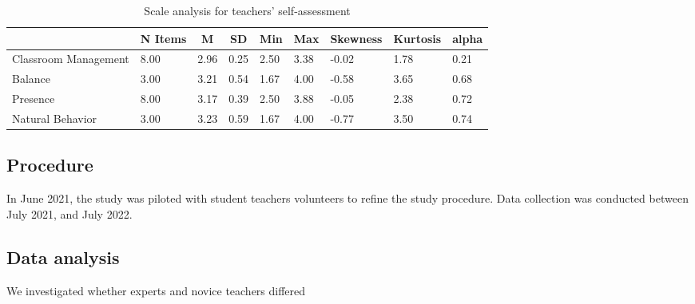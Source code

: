\documentclass[
  man,floatsintext]{apa6}
\begin{document}
\begin{table}[h]

\begin{center}
\begin{threeparttable}

\caption{\label{tab:presence_questionnaire}Scale analysis for teachers' self-assessment}

\tiny{

\begin{tabular}{lllllllll}
\toprule
 & \multicolumn{1}{c}{N Items} & \multicolumn{1}{c}{M} & \multicolumn{1}{c}{SD} & \multicolumn{1}{c}{Min} & \multicolumn{1}{c}{Max} & \multicolumn{1}{c}{Skewness} & \multicolumn{1}{c}{Kurtosis} & \multicolumn{1}{c}{alpha}\\
\midrule
Classroom Management & 8.00 & 2.96 & 0.25 & 2.50 & 3.38 & -0.02 & 1.78 & 0.21\\
Balance & 3.00 & 3.21 & 0.54 & 1.67 & 4.00 & -0.58 & 3.65 & 0.68\\
Presence & 8.00 & 3.17 & 0.39 & 2.50 & 3.88 & -0.05 & 2.38 & 0.72\\
Natural Behavior & 3.00 & 3.23 & 0.59 & 1.67 & 4.00 & -0.77 & 3.50 & 0.74\\
\bottomrule
\end{tabular}

}

\end{threeparttable}
\end{center}

\end{table}

\hypertarget{procedure}{%
\subsection{Procedure}\label{procedure}}

In June 2021, the study was piloted with student teachers volunteers to refine the study procedure. Data collection was conducted between July 2021, and July 2022.

\hypertarget{data-analysis}{%
\subsection{Data analysis}\label{data-analysis}}

We investigated whether experts and novice teachers differed
\end{document}
